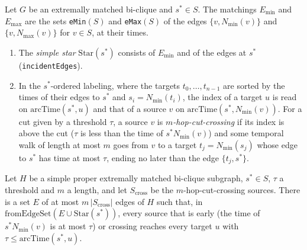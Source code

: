 \begin{definition}
  \label{def:simple-star-cut-crossing}
  \leanok
  Let $G$ be an extremally matched bi-clique and $s^* \in S$. The matchings
  $E_{\min}$ and $E_{\max}$ are the sets \texttt{eMin}$(S)$ and
  \texttt{eMax}$(S)$ of the edges $\{v, N_{\min}(v)\}$ and $\{v, N_{\max}(v)\}$
  for $v \in S$, at their times.
  \begin{enumerate}
  \item[(i)] The \emph{simple star} $\mathrm{Star}(s^*)$ consists of $E_{\min}$
    and of the edges at $s^*$ (\texttt{incidentEdges}).
  \item[(ii)] In the $s^*$-ordered labeling, where the targets
    $t_0, \ldots, t_{n-1}$ are sorted by the times of their edges to $s^*$ and
    $s_i = N_{\min}(t_i)$, the index of a target $u$ is read on
    $\mathrm{arcTime}(s^*, u)$ and that of a source $v$ on
    $\mathrm{arcTime}(s^*, N_{\min}(v))$. For a cut given by a threshold
    $\tau$, a source $v$ is \emph{$m$-hop-cut-crossing} if its index is above
    the cut ($\tau$ is less than the time of $s^*N_{\min}(v)$) and some
    temporal walk of length at most $m$ goes from $v$ to a target
    $t_j = N_{\min}(s_j)$ whose edge to $s^*$ has time at most $\tau$, ending
    no later than the edge $\{t_j, s^*\}$.
  \end{enumerate}
\end{definition}

\begin{lemma}
  \label{lem:reachable-simple-star}
  \leanok
  Let $H$ be a simple proper extremally matched bi-clique subgraph, $s^* \in S$,
  $\tau$ a threshold and $m$ a length, and let $S_{\mathrm{cross}}$ be the
  $m$-hop-cut-crossing sources. There is a set $E$ of at most
  $m\,|S_{\mathrm{cross}}|$ edges of $H$ such that, in
  $\mathrm{fromEdgeSet}(E \cup \mathrm{Star}(s^*))$, every source that is
  early (the time of $s^*N_{\min}(v)$ is at most $\tau$) or crossing reaches
  every target $u$ with $\tau \le \mathrm{arcTime}(s^*, u)$.
\end{lemma}

